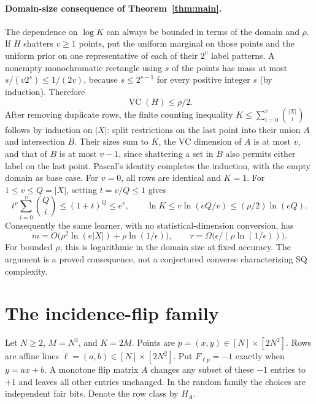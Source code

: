 \documentclass[11pt]{article}
\newcommand{\1}{\mathbf 1}
\begin{document}
\paragraph{Domain-size consequence of Theorem~\ref{thm:main}.}
The dependence on $\log K$ can always be bounded in terms of the domain and $\rho$. If $H$ shatters $v\ge1$ points, put the uniform marginal on those points and the uniform prior on one representative of each of their $2^v$ label patterns. A nonempty monochromatic rectangle using $s$ of the points has mass at most $s/(v2^s)\le1/(2v)$, because $s\le2^{s-1}$ for every positive integer $s$ (by induction). Therefore
\[
 \operatorname{VC}(H)\le\rho/2.
\]
After removing duplicate rows, the finite counting inequality $K\le\sum_{i=0}^v\binom{|X|}{i}$ follows by induction on $|X|$: split restrictions on the last point into their union $A$ and intersection $B$. Their sizes sum to $K$, the VC dimension of $A$ is at most $v$, and that of $B$ is at most $v-1$, since shattering a set in $B$ also permits either label on the last point. Pascal's identity completes the induction, with the empty domain as base case. For $v=0$, all rows are identical and $K=1$. For $1\le v\le Q=|X|$, setting $t=v/Q\le1$ gives
\[
 t^v\sum_{i=0}^v\binom Qi\le(1+t)^Q\le e^v,
 \qquad \ln K\le v\ln(eQ/v)\le(\rho/2)\ln(eQ).
\]
Consequently the same learner, with no statistical-dimension conversion, has
\[
 \boxed{m=O\bigl(\rho^2\ln(e|X|)+\rho\ln(1/\epsilon)\bigr),
 \qquad \tau=\Omega\bigl(\epsilon/(\rho\ln(1/\epsilon))\bigr).}
\]
For bounded $\rho$, this is logarithmic in the domain size at fixed accuracy. The argument is a proved consequence, not a conjectured converse characterizing SQ complexity.

\section{The incidence-flip family}
Let $N\ge2$, $M=N^3$, and $K=2M$. Points are $p=(x,y)\in[N]\times[2N^2]$. Rows are affine lines $\ell=(a,b)\in[N]\times[2N^2]$. Put $F_{\ell p}=-1$ exactly when $y=ax+b$. A monotone flip matrix $A$ changes any subset of these $-1$ entries to $+1$ and leaves all other entries unchanged. In the random family the choices are independent fair bits. Denote the row class by $H_A$.


\end{document}
